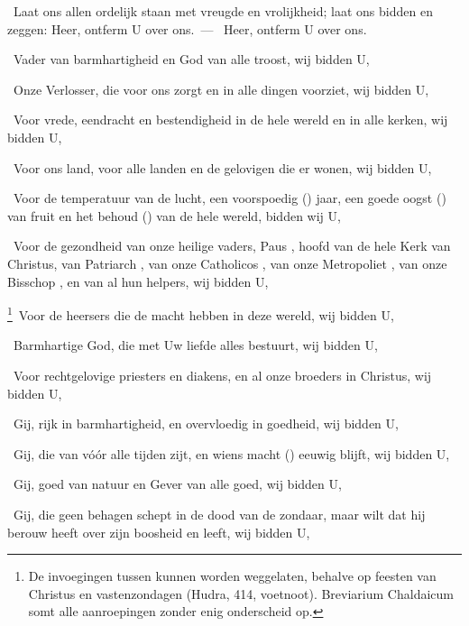\documentclass[12pt,twoside,a5paper]{article}
\begin{document}
\begin{halfparskip}
   \dd~Laat ons allen ordelijk staan met vreugde en vrolijkheid; laat ons bidden en zeggen: Heer, ontferm U over ons.~--- \rr~Heer, ontferm U over ons. 

  \dd~Vader van barmhartigheid en God van alle troost, wij bidden U,

  \dd~Onze Verlosser, die voor ons zorgt en in alle dingen voorziet, wij bidden U,

  \dd~Voor vrede, eendracht en bestendigheid in de hele wereld en in alle kerken, wij bidden U,

  \dd~Voor ons land, voor alle landen en de gelovigen die er wonen, wij bidden U,

  \dd~Voor de temperatuur van de lucht, een voorspoedig () jaar, een goede oogst () van fruit en het behoud () van de hele wereld, bidden wij U,

  \dd~Voor de gezondheid van onze heilige vaders, Paus \NN , hoofd van de hele Kerk van Christus, van Patriarch \NN , van onze Catholicos \NN , van onze Metropoliet \NN , van onze Bisschop \NN , en van al hun helpers, wij bidden U,

  \liturgicallbracket\footnote{De invoegingen tussen \liturgicaloption{[\ ]} kunnen worden weggelaten, behalve op feesten van Christus en vastenzondagen (Hudra, 414, voetnoot). Breviarium Chaldaicum somt alle aanroepingen zonder enig onderscheid op.}\dd~Voor de heersers die de macht hebben in deze wereld, wij bidden U,\liturgicalrbracket

  \dd~Barmhartige God, die met Uw liefde alles bestuurt, wij bidden U,

  \liturgicallbracket\dd~Voor rechtgelovige priesters en diakens, en al onze broeders in Christus, wij bidden U,\liturgicalrbracket

  \dd~Gij, rijk in barmhartigheid, en overvloedig in goedheid, wij bidden U,

  \liturgicallbracket\dd~Gij, die van vóór alle tijden zijt, en wiens macht () eeuwig blijft, wij bidden U,\liturgicalrbracket

  \dd~Gij, goed van natuur en Gever van alle goed, wij bidden U,

  \liturgicallbracket\dd~Gij, die geen behagen schept in de dood van de zondaar, maar wilt dat hij berouw heeft over zijn boosheid en leeft, wij bidden U,\liturgicalrbracket


\end{halfparskip}
\end{document}
